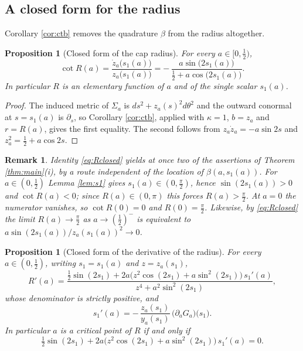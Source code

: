 \documentclass[10pt,a4paper]{amsart}
\newtheorem{proposition}[theorem]{Proposition}
\newtheorem{remark}[theorem]{Remark}
\begin{document}
\subsection*{A closed form for the radius}

Corollary \ref{cor:ctb} removes the quadrature $\beta$ from the radius altogether.

\begin{proposition}[Closed form of the cap radius]\label{prop:Rclosed}
For every $a\in[0,\tfrac12)$,
\begin{equation}\label{eq:Rclosed}
\cot R(a)=\frac{\dot z_a\bigl(s_1(a)\bigr)}{z_a\bigl(s_1(a)\bigr)}=-\,\frac{a\sin\bigl(2s_1(a)\bigr)}{\tfrac12+a\cos\bigl(2s_1(a)\bigr)} .
\end{equation}
In particular $R$ is an elementary function of $a$ and of the single scalar $s_1(a)$.
\end{proposition}

\begin{proof}
The induced metric of $\Sigma_a$ is $ds^2+z_a(s)^2d\theta^2$ and the outward conormal at $s=s_1(a)$ is $\partial_s$, so Corollary \ref{cor:ctb}, applied with $\kappa=1$, $b=z_a$ and $r=R(a)$, gives the first equality. The second follows from $z_a\dot z_a=-a\sin 2s$ and $z_a^2=\tfrac12+a\cos 2s$.
\end{proof}

\begin{remark}\label{rem:Rclosed}
Identity \eqref{eq:Rclosed} yields at once two of the assertions of Theorem \ref{thm:main}(i), by a route independent of the location of $\beta(a,s_1(a))$. For $a\in(0,\tfrac12)$ Lemma \ref{lem:s1} gives $s_1(a)\in(0,\tfrac\pi2)$, hence $\sin(2s_1(a))>0$ and $\cot R(a)<0$; since $R(a)\in(0,\pi)$ this forces $R(a)>\tfrac\pi2$. At $a=0$ the numerator vanishes, so $\cot R(0)=0$ and $R(0)=\tfrac\pi2$. Likewise, by \eqref{eq:Rclosed} the limit $R(a)\to\tfrac\pi2$ as $a\to(\tfrac12)^-$ is equivalent to $a\sin(2s_1(a))/z_a(s_1(a))^2\to 0$.
\end{remark}

\begin{proposition}[Closed form of the derivative of the radius]\label{prop:Rprime}
For every $a\in(0,\tfrac12)$, writing $s_1=s_1(a)$ and $z=z_a(s_1)$,
\begin{equation}\label{eq:Rprime}
R'(a)=\frac{\tfrac12\sin(2s_1)+2a\bigl(z^2\cos(2s_1)+a\sin^2(2s_1)\bigr)\,s_1'(a)}{z^4+a^2\sin^2(2s_1)} ,
\end{equation}
whose denominator is strictly positive, and
\begin{equation}\label{eq:s1prime}
s_1'(a)=-\,\frac{z_a(s_1)}{y_a(s_1)}\,\bigl(\partial_aG_a\bigr)\bigl(s_1\bigr).
\end{equation}
In particular $a$ is a critical point of $R$ if and only if
\begin{equation}\label{eq:critical}
\tfrac12\sin(2s_1)+2a\bigl(z^2\cos(2s_1)+a\sin^2(2s_1)\bigr)\,s_1'(a)=0 .
\end{equation}
\end{proposition}
\end{document}
